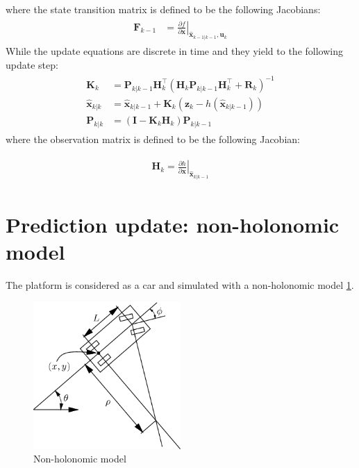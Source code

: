 where the state transition matrix is defined to be the following Jacobians:
\begin{align}
\begin{split}
\boldsymbol{F}_{k-1}&= \left.{\frac{\partial f}{\partial {\boldsymbol{x}}}} \right \vert_{\hat{\boldsymbol{x}}_{k-1|k-1},\boldsymbol{u}_{k}} 
\end{split}
\end{align}
While the update equations are discrete in time and they yield to the following update step: 
\begin{align}
\begin{split}
\boldsymbol{K}_{k} &= \boldsymbol{P}_{k|k-1} \boldsymbol{H}_{k}^{\top }(\boldsymbol{H}_{k} \boldsymbol{P}_{k|k-1} \boldsymbol{H}_{k}^{\top }+ \boldsymbol{R}_{k})^{-1}
\\
\hat{\boldsymbol{x}}_{k|k} &= \hat{\boldsymbol{x}}_{k|k-1} + \boldsymbol{K}_{k} (\boldsymbol{z}_{k}-h(\hat{\boldsymbol{x}}_{k|k-1}))
\\
\boldsymbol{P}_{k|k} &=(\boldsymbol{I}-\boldsymbol{K}_{k}\boldsymbol{H}_{k})\boldsymbol{P}_{k|k-1}
\end{split}
\end{align}
where the observation matrix is defined to be the following Jacobian:

\begin{align}
\begin{split}
\boldsymbol{H}_{k} = \left.{\frac{\partial h}{\partial {\boldsymbol{x}}}} \right \vert_{\hat{\boldsymbol{x}}_{k|k-1}}
\end{split}
\end{align}

\section{Prediction update: non-holonomic model}
The platform is considered as a car and simulated with a non-holonomic model \ref{fig:nonholonomicmodel}. 
\begin{figure}[!ht]
    \centering
    \includegraphics[width=0.5\textwidth]{img/non_holonomic_model.png}
    \caption{Non-holonomic model}
    \label{fig:nonholonomicmodel}
\end{figure}

